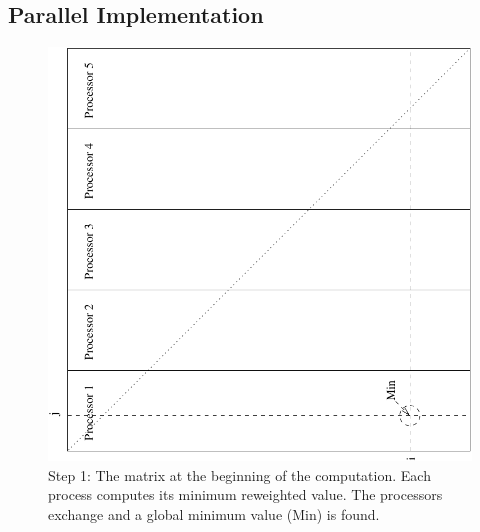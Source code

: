 \documentclass[letterpaper,12pt]{article}
\begin{document}
\subsection{Parallel Implementation}
\begin{figure}
\centering 
\includegraphics[angle=-90]{fig_mat.pdf}
\caption{Step 1: The matrix at the beginning of the computation. Each process
  computes its minimum reweighted value. The processors exchange and a
  global minimum value (Min) is found.}
\label{fig:mat_1}
\end{figure}
\end{document}
